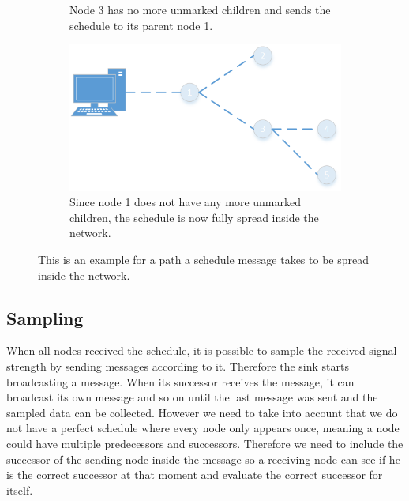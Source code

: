 \begin{figure}[htbp]
\begin{subfigure}[t]{0.4\textwidth}
   	 	\caption{Node 3 has no more unmarked children and sends the schedule to its parent node 1.}
    	\label{fig:spreading9}
    \end{subfigure}
    \quad
    \quad	
    \begin{subfigure}[t]{0.4\textwidth}
		\centering         
        \includegraphics[scale=0.6]{content/images/ScheduleSpreading/Part10}
        \caption{Since node 1 does not have any more unmarked children, the schedule is now fully spread inside the network.}
        \label{fig:spreading10}
    \end{subfigure}
    \caption{This is an example for a path a schedule message takes to be spread inside the network.}
     \label{fig:spreading}
\end{figure}

\subsection{Sampling}
\label{chp:apr_sampling}
When all nodes received the schedule, it is possible to sample the received signal strength by sending messages according to it. Therefore the sink starts broadcasting a message. When its successor receives the message, it can broadcast its own message and so on until the last message was sent and the sampled data can be collected. However we need to take into account that we do not have a perfect schedule where every node only appears once, meaning a node could have multiple predecessors and successors. Therefore we need to include the successor of the sending node inside the message so a receiving node can see if he is the correct successor at that moment and evaluate the correct successor for itself. 
